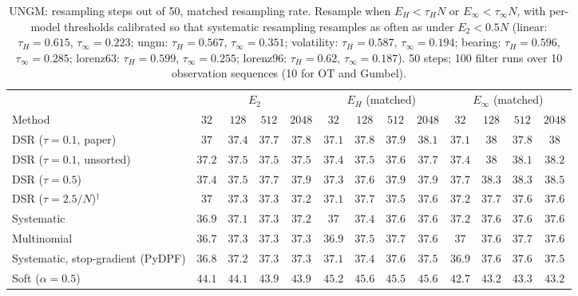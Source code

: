 \begin{table}[ht]
\centering
\small
\caption{UNGM: resampling steps out of 50, matched resampling rate. Resample when $E_H<\tau_HN$ or $E_\infty<\tau_\infty N$, with per-model thresholds calibrated so that systematic resampling resamples as often as under $E_2<0.5N$ (linear: $\tau_H{=}0.615$, $\tau_\infty{=}0.223$; ungm: $\tau_H{=}0.567$, $\tau_\infty{=}0.351$; volatility: $\tau_H{=}0.587$, $\tau_\infty{=}0.194$; bearing: $\tau_H{=}0.596$, $\tau_\infty{=}0.285$; lorenz63: $\tau_H{=}0.599$, $\tau_\infty{=}0.255$; lorenz96: $\tau_H{=}0.62$, $\tau_\infty{=}0.187$). 50 steps; 100 filter runs over 10 observation sequences (10 for OT and Gumbel).}
\label{tab:trigger-matched-ungm-resampling_steps}
\begin{adjustbox}{max width=\linewidth}
\begin{tabular}{lcccc|cccc|cccc}
\toprule
 & \multicolumn{4}{c}{$E_2$} & \multicolumn{4}{c}{$E_H$ (matched)} & \multicolumn{4}{c}{$E_\infty$ (matched)} \\
\cmidrule(lr){2-5} \cmidrule(lr){6-9} \cmidrule(lr){10-13}
Method & $32$ & $128$ & $512$ & $2048$ & $32$ & $128$ & $512$ & $2048$ & $32$ & $128$ & $512$ & $2048$ \\
\midrule
DSR ($\tau{=}0.1$, paper) & $37$ & $37.4$ & $37.7$ & $37.8$ & $37.1$ & $37.8$ & $37.9$ & $38.1$ & $37.1$ & $38$ & $37.8$ & $38$ \\
DSR ($\tau{=}0.1$, unsorted) & $37.2$ & $37.5$ & $37.5$ & $37.5$ & $37.4$ & $37.5$ & $37.6$ & $37.7$ & $37.4$ & $38$ & $38.1$ & $38.2$ \\
DSR ($\tau{=}0.5$) & $37.4$ & $37.5$ & $37.7$ & $37.9$ & $37.3$ & $37.6$ & $37.9$ & $37.9$ & $37.7$ & $38.3$ & $38.3$ & $38.5$ \\
DSR ($\tau{=}2.5/N$)$^\dagger$ & $37$ & $37.3$ & $37.3$ & $37.2$ & $37.1$ & $37.7$ & $37.5$ & $37.6$ & $37.2$ & $37.7$ & $37.6$ & $37.6$ \\
\midrule
Systematic & $36.9$ & $37.1$ & $37.3$ & $37.2$ & $37$ & $37.4$ & $37.6$ & $37.6$ & $37.2$ & $37.6$ & $37.6$ & $37.6$ \\
Multinomial & $36.7$ & $37.3$ & $37.3$ & $37.3$ & $36.9$ & $37.5$ & $37.7$ & $37.6$ & $37$ & $37.6$ & $37.7$ & $37.6$ \\
Systematic, stop-gradient (PyDPF) & $36.8$ & $37.2$ & $37.3$ & $37.3$ & $37.1$ & $37.4$ & $37.6$ & $37.5$ & $36.9$ & $37.6$ & $37.6$ & $37.5$ \\
Soft ($\alpha{=}0.5$) & $44.1$ & $44.1$ & $43.9$ & $43.9$ & $45.2$ & $45.6$ & $45.5$ & $45.6$ & $42.7$ & $43.2$ & $43.3$ & $43.2$ \\

\end{tabular}
\end{adjustbox}
\end{table}
